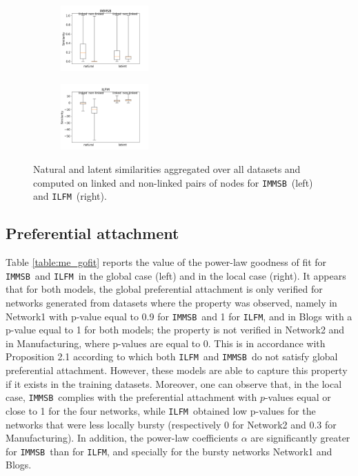 \documentclass[journal]{IEEEtran}
\newcommand{\ifm}{\texttt{ILFM}}
\newcommand{\imb}{\texttt{IMMSB}}
\begin{document}
\begin{figure}[ht]
\centering
    \begin{subfigure}
       	 \centering
        	 \includegraphics[width=0.37\textwidth]{img/corpus/homo_mustach_immsb}
    \end{subfigure}
    \begin{subfigure}
        	 \centering
          \includegraphics[width=0.37\textwidth]{img/corpus/homo_mustach_ilfm}
    \end{subfigure}
    \caption{Natural and latent similarities aggregated over all datasets and computed on linked and non-linked pairs of nodes for \imb\ (left) and \ifm\ (right).}
    \label{fig:homo_mustach}
\end{figure}

\subsection{Preferential attachment}

Table \ref{table:me_gofit} reports the value of the power-law goodness of fit for \imb\ and \ifm\ in the global case (left) and in the local case (right). It appears that for both models, the global preferential attachment is only verified for networks generated from datasets where the property was observed, namely in Network1 with p-value equal to 0.9 for \imb\ and 1 for \ifm, and in Blogs with a p-value equal to 1 for both models; the property is not verified in Network2 and in Manufacturing, where p-values are equal to 0. This is in accordance with Proposition 2.1 according to which both \ifm\ and \imb\ do not satisfy global preferential attachment. However, these models are able to capture this property if it exists in the training datasets.  Moreover, one can observe that, in the local case, \imb\ complies with the preferential attachment with $p$-values equal or close to 1 for the four networks, while \ifm\ obtained low p-values for the networks that were less locally bursty (respectively  0  for Network2 and 0.3 for Manufacturing). In addition, the power-law coefficients $\alpha$ are significantly greater for \imb\ than for \ifm, and specially for the bursty networks Network1 and Blogs.
\end{document}

